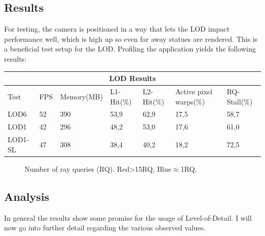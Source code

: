 \subsection{Results}
For testing, the camera is positioned in a way that lets the LOD impact performance well, which is high up so even far away statues are rendered. This is a beneficial test setup for the LOD. Profiling the application yields the following results:\\
\begin{center}
    \small{
\begin{tabular}{ |p{1.8cm}||p{0.7cm}|p{2.05cm}|p{1.8cm}|p{1.8cm}|p{2cm}|p{1.2cm}|  }
 \hline
 \multicolumn{7}{|c|}{LOD Results} \\
 \hline
 Test & FPS & Memory(MB) & L1-Hit(\%) & L2-Hit(\%) & Active pixel warps(\%) & RQ-Stall(\%)\\
 \hline
 LOD6   &   52  &   390 &   53,9    &   62,9    &   17,5    &   58,7\\
 \hline
 LOD1    &   42 &   296 &   48,2    &   53,0    &   17,6    &   61,0\\
 \hline
 LOD1-SL  &   47  &   308 &   38,4    &   40,2    &   18,2    &   72,5\\
 \hline
\end{tabular}
}
\end{center}
\begin{figure}
\hfill
{}
\hfill
{}
\hfill
\caption{Number of ray queries (RQ). Red>15RQ, Blue$\approx$1RQ.}
\label{fig:LODRQCount}
\end{figure}
\subsection{Analysis}
In general the results show some promise for the usage of Level-of-Detail. I will now go into further detail regarding the various observed values.
